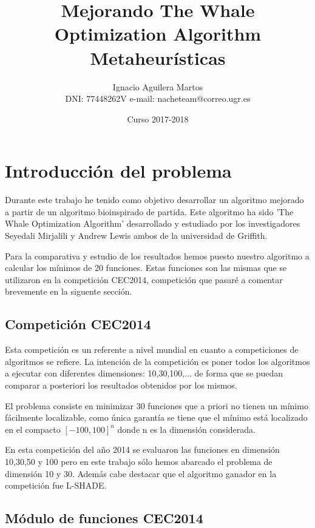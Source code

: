 \documentclass[12pt,a4paper]{article}
\author{Ignacio Aguilera Martos \\
	DNI: 77448262V       e-mail: nacheteam@correo.ugr.es}
\title{Mejorando The Whale Optimization Algorithm \\ Metaheurísticas}
\date{Curso 2017-2018}
\begin{document}
	\maketitle

	\tableofcontents

	\newpage



	\section{Introducción del problema}
	\label{sec:introProblema}
	
		Durante este trabajo he tenido como objetivo desarrollar un algoritmo mejorado a partir de un algoritmo bioinspirado de partida. Este algoritmo ha sido 'The Whale Optimization Algorithm' desarrollado y estudiado por los investigadores Seyedali Mirjalili y Andrew Lewis ambos de la universidad de Griffith.
		
		Para la comparativa y estudio de los resultados hemos puesto nuestro algoritmo a calcular los mínimos de 20 funciones. Estas funciones son las mismas que se utilizaron en la competición CEC2014, competición que pasaré a comentar brevemente en la siguente sección.
	
	\subsection{Competición CEC2014}
	
		Esta competición es un referente a nivel mundial en cuanto a competiciones de algoritmos se refiere. La intención de la competición es poner todos los algoritmos a ejecutar con diferentes dimensiones: 10,30,100,... de forma que se puedan comparar a posteriori los resultados obtenidos por los mismos.
		
		El problema consiste en minimizar 30 funciones que a priori no tienen un mínimo fácilmente localizable, como única garantía se tiene que el mínimo está localizado en el compacto $[-100,100]^n$ donde n es la dimensión considerada.
		
		En esta competición del año 2014 se evaluaron las funciones en dimensión 10,30,50 y 100 pero en este trabajo sólo hemos abarcado el problema de dimensión 10 y 30. Además cabe destacar que el algoritmo ganador en la competición fue L-SHADE.
	
	\subsection{Módulo de funciones CEC2014}
	
\end{document}
